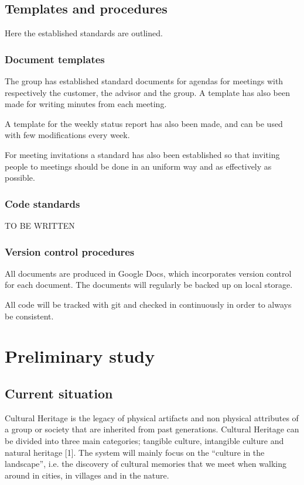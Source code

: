 \documentclass[11pt]{book}
\begin{document}
\section{Templates and procedures}
Here the established standards are outlined.

\subsection{Document templates}
The group has established standard documents for agendas for meetings with respectively the customer, the advisor and the group. A template has also been made for writing minutes from each meeting.

A template for the weekly status report has also been made, and can be used with few modifications every week.

For meeting invitations a standard has also been established so that inviting people to meetings should be done in an uniform way and as effectively as possible.

\subsection{Code standards}
TO BE WRITTEN

\subsection{Version control procedures}
All documents are produced in Google Docs, which incorporates version control for each document. The documents will regularly be backed up on local storage.

All code will be tracked with git and checked in continuously in order to always be consistent.

\chapter{Preliminary study}

\section{Current situation}
Cultural Heritage is the legacy of physical artifacts and non physical attributes of a group or society that are inherited from past generations. Cultural Heritage can be divided into three main categories; tangible culture, intangible culture and natural heritage [1]. The system will mainly focus on the ``culture in the landscape'', i.e. the discovery of cultural memories that we meet when walking around in cities, in villages and in the nature.
\end{document}

